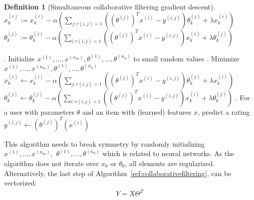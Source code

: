 \documentclass{report}
\newtheorem{definition}{Definition}[section]
\begin{document}
\begin{definition}[Simultaneous collaborative filtering gradient descent]~\\
$x_k^{(i)}:=x_k^{(i)}-\alpha(\sum_{j:r(i,j)=1}((\theta^{(j)})^Tx^{(i)}-y^{(i,j)})\theta_k^{(j)}+\lambda x_k^{(i)})$ \\
$\theta_k^{(j)}:=\theta_k^{(j)}-\alpha(\sum_{i:r(i,j)=1}((\theta^{(j)})^Tx^{(i)}-y^{(i,j)})x_k^{(i)}+\lambda \theta_k^{(j)})$
\end{definition}

\begin{algorithm}
\caption{Collaborative filtering}
\label{ref:collaborativefiltering}
\begin{algorithmic}
. Initialize $x^{(1)},...,x^{(n_m)},\theta^{(1)},...,\theta^{(n_u)}$ to small random values 
. Minimize $x^{(1)},...,x^{(n_m)},\theta^{(1)},...,\theta^{(n_u)}$
\State $x_k^{(i)}\gets x_k^{(i)}-\alpha(\sum_{j:r(i,j)=1}((\theta^{(j)})^Tx^{(i)}-y^{(i,j)})\theta_k^{(j)}+\lambda x_k^{(i)})$
\State $\theta_k^{(j)}\gets \theta_k^{(j)}-\alpha(\sum_{i:r(i,j)=1}((\theta^{(j)})^Tx^{(i)}-y^{(i,j)})x_k^{(i)}+\lambda \theta_k^{(j)})$
. For a user with parameters $\theta$ and an item with (learned) features $x$, predict a rating
\State $y^{(i,j)}\gets (\theta^{(j)})^T(x^{(i)})$
\end{algorithmic}
\end{algorithm}

This algorithm needs to break symmetry by randomly initializing $x^{(1)},...,x^{(n_m)},$ $\theta^{(1)},...,\theta^{(n_u)}$ which is related to neural networks. As the algorithm does not iterate over $x_0$ or $\theta_0$, all elements are regularized. Alternatively, the last step of Algorithm~\ref{ref:collaborativefiltering}, can be vectorized:
\begin{align*}
Y = X\Theta^T
\end{align*}
\end{document}

